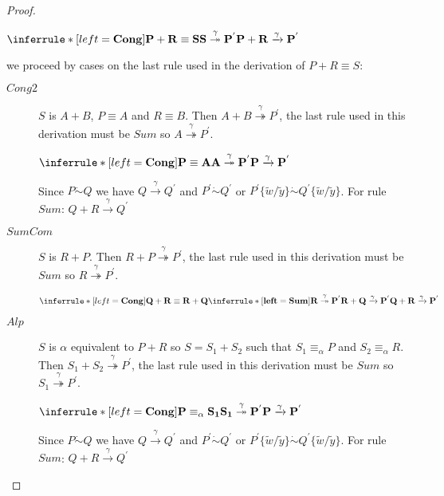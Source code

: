 \begin{proposition}
\begin{proof}
\begin{description}
	    \begin{center}
	      $\inferrule* [left=\bf{Cong}]{
		  P+R\equiv S
		\\
		  S \stackrel{\gamma}{\twoheadrightarrow} P^{'}
	      }{
		P+R \xrightarrow{\gamma} P^{'}
	      }$
	    \end{center}
	    we proceed by cases on the last rule used in the derivation of $P+R\equiv S$:
	    \begin{description}
	      \item[$Cong2$]
		$S$ is $A+B$, $P \equiv A$ and $R \equiv B$. Then $A+B \stackrel{\gamma}{\twoheadrightarrow} P^{'}$, the last rule used in this derivation must be $Sum$ so $A \stackrel{\gamma}{\twoheadrightarrow} P^{'}$. 
		\begin{center}
		  $\inferrule* [left=\bf{Cong}]{
		      P\equiv A
		    \\
		      A \stackrel{\gamma}{\twoheadrightarrow} P^{'}
		  }{
		    P \xrightarrow{\gamma} P^{'}
		  }$
		\end{center}
		Since $P\dot{\sim}Q$ we have $Q \xrightarrow{\gamma} Q^{'}$ and $P^{'} \dot{\sim} Q^{'}$ or $P^{'}\{\tilde{w}/\tilde{y}\} \dot{\sim} Q^{'}\{\tilde{w}/\tilde{y}\}$. For rule $Sum$: $Q+R \xrightarrow{\gamma} Q^{'}$
	      \item[$SumCom$]
		$S$ is $R+P$. Then $R+P \stackrel{\gamma}{\twoheadrightarrow} P^{'}$, the last rule used in this derivation must be $Sum$ so $R \stackrel{\gamma}{\twoheadrightarrow} P^{'}$. 
		\begin{center}
		  $\inferrule* [left=\bf{Cong}]{
		      Q+R\equiv R+Q
		    \\
			\inferrule* [left=\bf{Sum}]{
			    R \stackrel{\gamma}{\twoheadrightarrow} P^{'}
			}{
			  R+Q \xrightarrow{\gamma} P^{'}
			}
		  }{
		    Q+R \xrightarrow{\gamma} P^{'}
		  }$
		\end{center}
	      \item[$Alp$]
		$S$ is $\alpha$ equivalent to $P+R$ so $S=S_{1}+S_{2}$ such that $S_{1}\equiv_{\alpha}P$ and $S_{2}\equiv_{\alpha}R$. Then  $S_{1}+S_{2} \stackrel{\gamma}{\twoheadrightarrow} P^{'}$, the last rule used in this derivation must be $Sum$ so $S_{1} \stackrel{\gamma}{\twoheadrightarrow} P^{'}$. 
		\begin{center}
		  $\inferrule* [left=\bf{Cong}]{
			    P\equiv_{\alpha}S_{1}
			  \\
			    S_{1} \stackrel{\gamma}{\twoheadrightarrow} P^{'}
			}{
			  P \xrightarrow{\gamma} P^{'}
			}$
		\end{center}
		Since $P\dot{\sim}Q$ we have $Q \xrightarrow{\gamma} Q^{'}$ and $P^{'} \dot{\sim} Q^{'}$ or $P^{'}\{\tilde{w}/\tilde{y}\} \dot{\sim} Q^{'}\{\tilde{w}/\tilde{y}\}$. For rule $Sum$: $Q+R \xrightarrow{\gamma} Q^{'}$

\end{description}
\end{description}
\end{proof}
\end{proposition}
